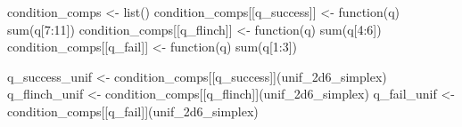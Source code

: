 \documentclass[
  letterpaper,
  DIV=11,
  numbers=noendperiod]{scrartcl}
\newenvironment{Shaded}{\begin{snugshade}}{\end{snugshade}}
\newcommand{\ControlFlowTok}[1]{\textcolor[rgb]{0.00,0.23,0.31}{#1}}
\newcommand{\DecValTok}[1]{\textcolor[rgb]{0.68,0.00,0.00}{#1}}
\newcommand{\FunctionTok}[1]{\textcolor[rgb]{0.28,0.35,0.67}{#1}}
\newcommand{\NormalTok}[1]{\textcolor[rgb]{0.00,0.23,0.31}{#1}}
\newcommand{\OtherTok}[1]{\textcolor[rgb]{0.00,0.23,0.31}{#1}}
\newcommand{\SpecialCharTok}[1]{\textcolor[rgb]{0.37,0.37,0.37}{#1}}
\newcommand{\StringTok}[1]{\textcolor[rgb]{0.13,0.47,0.30}{#1}}
\begin{document}
\begin{Shaded}
\begin{Highlighting}[]
\NormalTok{condition\_comps }\OtherTok{\textless{}{-}} \FunctionTok{list}\NormalTok{()}
\NormalTok{condition\_comps[[}\StringTok{\textquotesingle{}q\_success\textquotesingle{}}\NormalTok{]] }\OtherTok{\textless{}{-}} \ControlFlowTok{function}\NormalTok{(q) }\FunctionTok{sum}\NormalTok{(q[}\DecValTok{7}\SpecialCharTok{:}\DecValTok{11}\NormalTok{])}
\NormalTok{condition\_comps[[}\StringTok{\textquotesingle{}q\_flinch\textquotesingle{}}\NormalTok{]] }\OtherTok{\textless{}{-}} \ControlFlowTok{function}\NormalTok{(q) }\FunctionTok{sum}\NormalTok{(q[}\DecValTok{4}\SpecialCharTok{:}\DecValTok{6}\NormalTok{])}
\NormalTok{condition\_comps[[}\StringTok{\textquotesingle{}q\_fail\textquotesingle{}}\NormalTok{]] }\OtherTok{\textless{}{-}} \ControlFlowTok{function}\NormalTok{(q) }\FunctionTok{sum}\NormalTok{(q[}\DecValTok{1}\SpecialCharTok{:}\DecValTok{3}\NormalTok{])}

\NormalTok{q\_success\_unif }\OtherTok{\textless{}{-}}\NormalTok{ condition\_comps[[}\StringTok{\textquotesingle{}q\_success\textquotesingle{}}\NormalTok{]](unif\_2d6\_simplex)}
\NormalTok{q\_flinch\_unif }\OtherTok{\textless{}{-}}\NormalTok{ condition\_comps[[}\StringTok{\textquotesingle{}q\_flinch\textquotesingle{}}\NormalTok{]](unif\_2d6\_simplex)}
\NormalTok{q\_fail\_unif }\OtherTok{\textless{}{-}}\NormalTok{ condition\_comps[[}\StringTok{\textquotesingle{}q\_fail\textquotesingle{}}\NormalTok{]](unif\_2d6\_simplex)}
\end{Highlighting}
\end{Shaded}

\begin{Shaded}
\end{Shaded}
\end{document}

